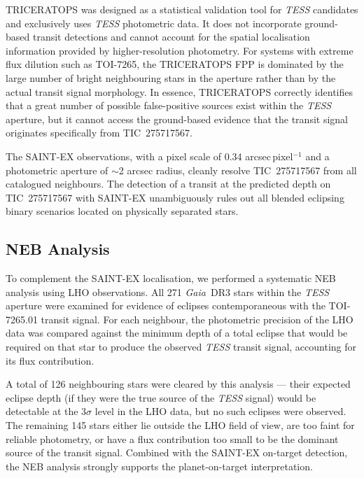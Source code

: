 \documentclass[fleqn,usenatbib]{mnras}
\newcommand{\SAINTEX}{SAINT-EX}
\newcommand{\triceratops}{\textsc{TRICERATOPS}}
\begin{document}
\triceratops{} was designed as a statistical validation tool for \textit{TESS} candidates and exclusively uses \textit{TESS} photometric data. It does not incorporate ground-based transit detections and cannot account for the spatial localisation information provided by higher-resolution photometry. For systems with extreme flux dilution such as TOI-7265, the \triceratops{} FPP is dominated by the large number of bright neighbouring stars in the aperture rather than by the actual transit signal morphology. In essence, \triceratops{} correctly identifies that a great number of possible false-positive sources exist within the \textit{TESS} aperture, but it cannot access the ground-based evidence that the transit signal originates specifically from TIC~275717567.

The \SAINTEX{} observations, with a pixel scale of 0.34 arcsec\,pixel$^{-1}$ and a photometric aperture of $\sim$2 arcsec radius, cleanly resolve TIC~275717567 from all catalogued neighbours. The detection of a transit at the predicted depth on TIC~275717567 with \SAINTEX{} unambiguously rules out all blended eclipsing binary scenarios located on physically separated stars.

\subsection{NEB Analysis}
\label{sec:neb}

To complement the \SAINTEX{} localisation, we performed a systematic NEB analysis using LHO observations. All 271 \textit{Gaia}~DR3 stars within the \textit{TESS} aperture were examined for evidence of eclipses contemporaneous with the TOI-7265.01 transit signal. For each neighbour, the photometric precision of the LHO data was compared against the minimum depth of a total eclipse that would be required on that star to produce the observed \textit{TESS} transit signal, accounting for its flux contribution.

A total of 126 neighbouring stars were cleared by this analysis — their expected eclipse depth (if they were the true source of the \textit{TESS} signal) would be detectable at the $3\sigma$ level in the LHO data, but no such eclipses were observed. The remaining 145 stars either lie outside the LHO field of view, are too faint for reliable photometry, or have a flux contribution too small to be the dominant source of the transit signal. Combined with the \SAINTEX{} on-target detection, the NEB analysis strongly supports the planet-on-target interpretation.
\end{document}
